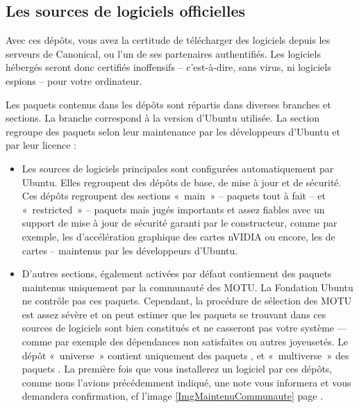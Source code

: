 {\subsection{Les sources de logiciels officielles}
Avec ces dépôts, vous avez la certitude de télécharger des logiciels depuis les serveurs de Canonical, ou l'un de ses partenaires authentifiés. Les logiciels hébergés seront donc certifiés inoffensifs -- c'est-à-dire, sans virus, ni logiciels espions -- pour votre ordinateur.\par
Les paquets contenus dans les dépôts sont répartis dans diverses branches et sections. La branche correspond à la version d'Ubuntu utilisée. La section regroupe des paquets selon leur maintenance par les développeurs d'Ubuntu et par leur licence :\par
\begin{itemize}
\item Les sources de logiciels principales sont configurées automatiquement par Ubuntu. Elles regroupent des dépôts de base, de mise à jour et de sécurité. Ces dépôts regroupent des sections «~main~» -- paquets tout à fait  -- et «~restricted~» -- paquets  mais jugés importants et assez fiables avec un support de mise à jour de sécurité garanti par le constructeur, comme par exemple, les  d'accélération graphique des cartes nVIDIA ou encore, les  de cartes  -- maintenus par les développeurs d'Ubuntu.
\item D'autres sections, également activées par défaut contiennent des paquets maintenus uniquement par la communauté des MOTU. La Fondation Ubuntu ne contrôle pas ces paquets. Cependant, la procédure de sélection des MOTU est assez sévère et on peut estimer que les paquets se trouvant dans ces sources de logiciels sont bien constitués et ne casseront pas votre système --- comme par exemple des dépendances non satisfaites ou autres joyeusetés. Le dépôt «~universe~» contient uniquement des paquets , et «~multiverse~» des paquets . La première fois que vous installerez un logiciel par ces dépôts, comme nous l'avions précédemment indiqué, une note vous informera et vous demandera confirmation, cf l'image \ref{ImgMaintenuCommunaute} page \pageref{ImgMaintenuCommunaute}.

\end{itemize}}
